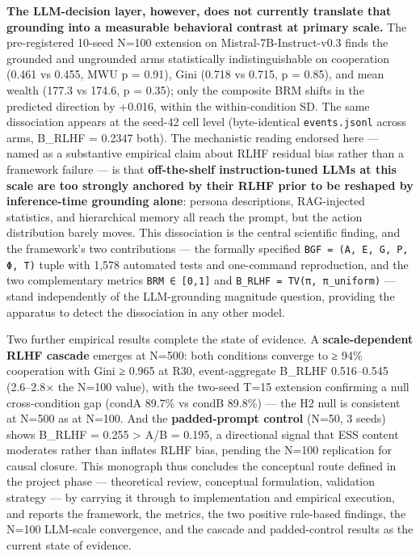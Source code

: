 \textbf{The LLM-decision layer, however, does not currently translate that grounding into a measurable behavioral contrast at primary scale.} The pre-registered 10-seed N=100 extension on Mistral-7B-Instruct-v0.3 finds the grounded and ungrounded arms statistically indistinguishable on cooperation (0.461 vs 0.455, MWU p = 0.91), Gini (0.718 vs 0.715, p = 0.85), and mean wealth (177.3 vs 174.6, p = 0.35); only the composite BRM shifts in the predicted direction by +0.016, within the within-condition SD. The same dissociation appears at the seed-42 cell level (byte-identical \texttt{events.jsonl} across arms, B\_RLHF = 0.2347 both). The mechanistic reading endorsed here — named as a substantive empirical claim about RLHF residual bias rather than a framework failure — is that \textbf{off-the-shelf instruction-tuned LLMs at this scale are too strongly anchored by their RLHF prior to be reshaped by inference-time grounding alone}: persona descriptions, RAG-injected statistics, and hierarchical memory all reach the prompt, but the action distribution barely moves. This dissociation is the central scientific finding, and the framework's two contributions — the formally specified \texttt{BGF = (A, E, G, P, Φ, T)} tuple with 1,578 automated tests and one-command reproduction, and the two complementary metrics \texttt{BRM ∈ [0,1]} and \texttt{B\_RLHF = TV(π, π\_uniform)} — stand independently of the LLM-grounding magnitude question, providing the apparatus to detect the dissociation in any other model.

Two further empirical results complete the state of evidence. A \textbf{scale-dependent RLHF cascade} emerges at N=500: both conditions converge to ≥ 94\% cooperation with Gini ≥ 0.965 at R30, event-aggregate B\_RLHF 0.516–0.545 (2.6–2.8× the N=100 value), with the two-seed T=15 extension confirming a null cross-condition gap (condA 89.7\% vs condB 89.8\%) — the H2 null is consistent at N=500 as at N=100. And the \textbf{padded-prompt control} (N=50, 3 seeds) shows B\_RLHF = 0.255 > A/B = 0.195, a directional signal that ESS content moderates rather than inflates RLHF bias, pending the N=100 replication for causal closure. This monograph thus concludes the conceptual route defined in the project phase — theoretical review, conceptual formulation, validation strategy — by carrying it through to implementation and empirical execution, and reports the framework, the metrics, the two positive rule-based findings, the N=100 LLM-scale convergence, and the cascade and padded-control results as the current state of evidence.

